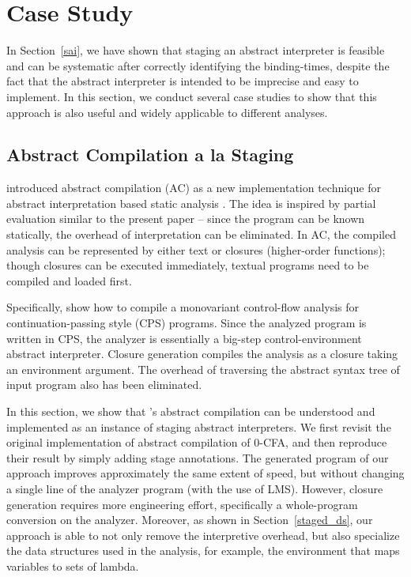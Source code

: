 \section{Case Study} \label{cases_study}

In Section~\ref{sai}, we have shown that staging an abstract interpreter is feasible and can be
systematic after correctly identifying the binding-times, despite the fact that the abstract
interpreter is intended to be imprecise and easy to implement.
In this section, we conduct several case studies to show that this approach is also useful and
widely applicable to different analyses.

\subsection{Abstract Compilation a la Staging} \label{cs_ac}

\citeauthor{Boucher:1996:ACN:647473.727587} introduced abstract compilation (AC) as a new
implementation technique for abstract interpretation based static analysis \cite{Boucher:1996:ACN:647473.727587}.
The idea is inspired by partial evaluation similar to the present paper -- since the program can be known
statically, the overhead of interpretation can be eliminated.
In AC, the compiled analysis can be represented by either text or closures (higher-order functions);
though closures can be executed immediately, textual programs need to be compiled and loaded first.

Specifically, \citeauthor{Boucher:1996:ACN:647473.727587} show how to compile a monovariant control-flow
analysis \cite{Shivers:1991:SSC:115865.115884, Shivers:1988:CFA:53990.54007}
for continuation-passing style (CPS) programs. Since the analyzed program is written in CPS, the analyzer
is essentially a big-step control-environment abstract interpreter.
Closure generation compiles the analysis as a closure taking an environment argument.
The overhead of traversing the abstract syntax tree of input program also has been eliminated.

In this section, we show that \citeauthor{Boucher:1996:ACN:647473.727587}'s abstract compilation can be
understood and implemented as an instance of staging abstract interpreters.
We first revisit the original implementation of abstract compilation of 0-CFA,
and then reproduce their result by simply adding stage annotations.
The generated program of our approach improves approximately the same extent of speed,
but without changing a single line of the analyzer program (with the use of LMS).
However, closure generation requires more engineering effort, specifically a whole-program
conversion on the analyzer. Moreover, as shown in Section~\ref{staged_ds},
our approach is able to not only remove the interpretive overhead, but also specialize
the data structures used in the analysis, for example, the environment that maps variables to sets of lambda.

